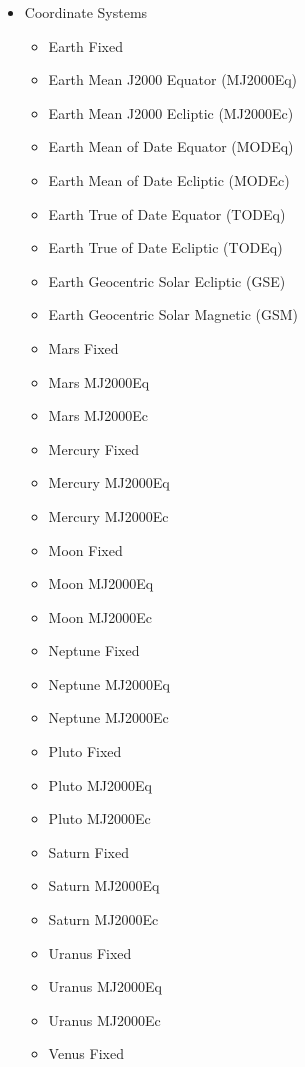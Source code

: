 \begin{itemize}
    \item Coordinate Systems
        \begin{itemize}
            \item Earth Fixed
            \item Earth Mean J2000 Equator (MJ2000Eq)
            \item Earth Mean J2000 Ecliptic (MJ2000Ec)
            \item Earth Mean of Date Equator (MODEq)
            \item Earth Mean of Date Ecliptic (MODEc)
            \item Earth True of Date Equator (TODEq)
            \item Earth True of Date Ecliptic (TODEq)
            \item Earth Geocentric Solar Ecliptic (GSE)
            \item Earth Geocentric Solar Magnetic (GSM)
            \item Mars Fixed
            \item Mars MJ2000Eq
            \item Mars MJ2000Ec
            \item Mercury Fixed
            \item Mercury MJ2000Eq
            \item Mercury MJ2000Ec
            \item Moon Fixed
            \item Moon MJ2000Eq
            \item Moon MJ2000Ec
            \item Neptune Fixed
            \item Neptune MJ2000Eq
            \item Neptune MJ2000Ec
            \item Pluto Fixed
            \item Pluto MJ2000Eq
            \item Pluto MJ2000Ec
            \item Saturn Fixed
            \item Saturn MJ2000Eq
            \item Saturn MJ2000Ec
            \item Uranus Fixed
            \item Uranus MJ2000Eq
            \item Uranus MJ2000Ec
            \item Venus Fixed

\end{itemize}
\end{itemize}
